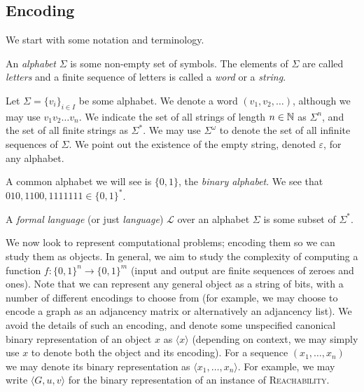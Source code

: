 \subsection{Encoding}

We start with some notation and terminology. 

\begin{definition}
  \label{def:word-alphabet}
  An \emph{alphabet} $\Sigma$ is some non-empty set of symbols. The elements of $\Sigma$ are called \emph{letters} and a finite sequence of letters is called a \emph{word} or a \emph{string}. 
\end{definition}

Let $\Sigma = \{v_i\}_{i \in I}$ be some alphabet. We denote a word $(v_1, v_2, \ldots)$, although we may use $v_1v_2\ldots v_n$. We indicate the set of all strings of length $n \in \mathbb N$ as $\Sigma^n$, and the set of all finite strings as $\Sigma^*$. We may use $\Sigma^\omega$ to denote the set of all infinite sequences of $\Sigma$. We point out the existence of the empty string, denoted $\varepsilon$, for any alphabet. 

\begin{example}
  \label{exa:binary-alphabet}
  A common alphabet we will see is $\{0,1\}$, the \emph{binary alphabet}. We see that $010, 1100, 1111111 \in \{0,1\}^*$. 
\end{example}

\begin{definition}
  A \emph{formal language} (or just \emph{language}) $\mathcal L$ over an alphabet $\Sigma$ is some subset of $\Sigma^*$. 
\end{definition}


We now look to represent computational problems; encoding them so we can study them as objects. In general, we aim to study the complexity of computing a function $f: \{0,1\}^n \to \{0,1\}^m$ (input and output are finite sequences of zeroes and ones). Note that we can represent any general object as a string of bits, with a number of different encodings to choose from (for example, we may choose to encode a graph as an adjancency matrix or alternatively an adjancency list). We avoid the details of such an encoding, and denote some unspecified canonical binary representation of an object $x$ as $\langle x \rangle$ (depending on context, we may simply use $x$ to denote both the object and its encoding). For a sequence $(x_1, \ldots, x_n)$ we may denote its binary representation as $\langle x_1, \ldots, x_n \rangle$. For example, we may write $\langle G, u, v \rangle$ for the binary representation of an instance of \textsc{Reachability}. 

